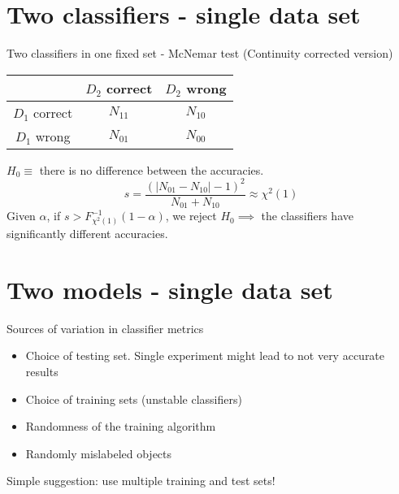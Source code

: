 \documentclass{beamer}
\begin{document}

\section{Two classifiers - single data set}

\begin{frame}{Two classifiers in one fixed set - McNemar test (Continuity corrected version) \citep{McNemarContinuity}}

    \begin{table}[]
        \centering
        \begin{tabular}{c|cc}
        & \(D_2\) correct & \(D_2\) wrong \\
        \hline
            \(D_1\) correct & \(N_{11}\) & \(N_{10}\) \\
            \(D_1\) wrong & \(N_{01}\) & \(N_{00}\)
        \end{tabular}
    \end{table}

\pause
    \(H_0 \equiv\) there is no difference between the accuracies.
    \[
    s = \frac{\left(\lvert N_{01}
     - N_{10}\rvert - 1\right)^2}{N_{01} + N_{10}} \approx \chi^2(1)
    \]
    Given \(\alpha\), if \( s > F^{-1}_{\chi^2(1)}(1- \alpha) \), we reject \(H_0 \implies\) the classifiers have significantly different accuracies.
\end{frame}




\section{Two models - single data set}

\begin{frame}{Sources of variation in classifier metrics}
    \begin{itemize}
        \item Choice of testing set. Single experiment might lead to not very accurate results
        \pause
        \item Choice of training sets (unstable classifiers)
        \pause
        \item Randomness of the training algorithm
        \pause
        \item Randomly mislabeled objects
    \end{itemize}
    \pause
    \vspace{1cm}
    Simple suggestion: use multiple training and test sets!
\end{frame}
\end{document}
